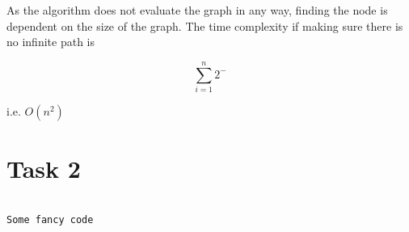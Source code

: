 \documentclass[]{article}
\begin{document}
As the algorithm does not evaluate the graph in any way, finding the node is dependent on the size of the graph. The time complexity if making sure there is no infinite path is 

$$\sum_{i=1}^{n} 2^{-}$$ 

i.e. $O(n^2)$ 

\newpage
\section*{Task 2}

\begin{lstlisting}

Some fancy code

\end{lstlisting}
\end{document}
